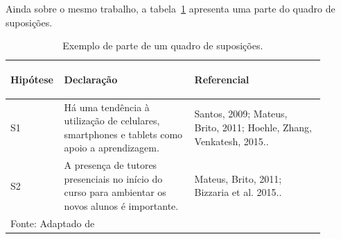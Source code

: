 Ainda sobre o mesmo trabalho, a tabela~\ref{tab:quadro_suposicoes} apresenta uma parte do quadro de suposições.

\begin{table}[H]
	\caption{Exemplo de parte de um quadro de suposições.}
	\begin{center}
		\fontsize{10pt}{13pt}\selectfont
		\begin{tabular}{|p{0.1\linewidth}|p{0.4\linewidth}|p{0.4\linewidth}|}
			\hline
			\rowcolor{gray!10}
			\begin{center}
				\textbf{Hipótese}
			\end{center} &
			\begin{center}
				\textbf{Declaração}
			\end{center} &
			\begin{center}
				\textbf{Referencial}
			\end{center} \\
			\hline
			{\centering S1 \par} & Há uma tendência à utilização de celulares, smartphones e tablets como apoio a aprendizagem. & Santos, 2009; Mateus, Brito, 2011; Hoehle, Zhang, Venkatesh, 2015.. \\
			\hline
			{\centering S2 \par} & A presença de tutores presenciais no início do curso para ambientar os novos alunos é importante. & Mateus, Brito, 2011; Bizzaria et al. 2015.. \\
			\hline
			\multicolumn{3}{l}{Fonte: Adaptado de \cite[37]{DissertacaoElton2015}}
		\end{tabular}
		\label{tab:quadro_suposicoes}
	\end{center}
\end{table}
